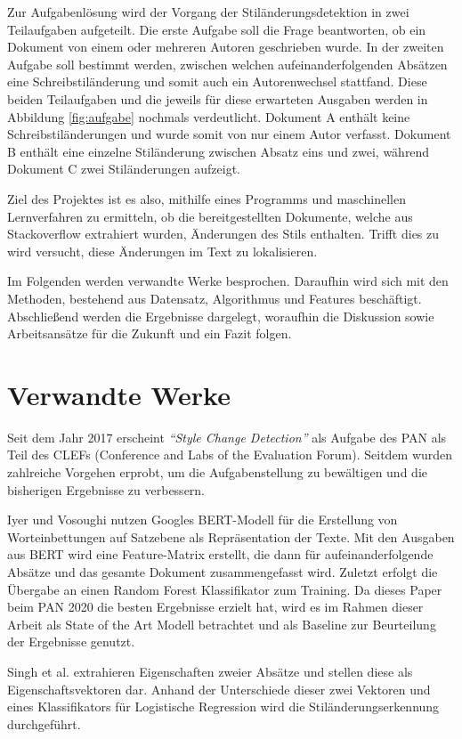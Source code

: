 \documentclass[conference]{IEEEtran}
\begin{document}
	Zur Aufgabenlösung wird der Vorgang der Stiländerungsdetektion in zwei Teilaufgaben aufgeteilt. Die erste Aufgabe soll die Frage beantworten, ob ein Dokument von einem oder mehreren Autoren geschrieben wurde. In der zweiten Aufgabe soll bestimmt werden, zwischen welchen aufeinanderfolgenden Absätzen eine Schreibstiländerung und somit auch ein Autorenwechsel stattfand. Diese beiden Teilaufgaben und die jeweils für diese erwarteten Ausgaben werden in Abbildung \ref{fig:aufgabe} nochmals verdeutlicht. Dokument A enthält keine Schreibstiländerungen und wurde somit von nur einem Autor verfasst. Dokument B enthält eine einzelne Stiländerung zwischen Absatz eins und zwei, während Dokument C zwei Stiländerungen aufzeigt. 
	
	Ziel des Projektes ist es also, mithilfe eines Programms und maschinellen Lernverfahren zu ermitteln, ob die bereitgestellten Dokumente, welche aus Stackoverflow extrahiert wurden, Änderungen des Stils enthalten. Trifft dies zu wird versucht, diese Änderungen im Text zu lokalisieren.
	
	
	Im Folgenden werden verwandte Werke besprochen. Daraufhin wird sich mit den Methoden, bestehend aus Datensatz, Algorithmus und Features beschäftigt. Abschließend werden die Ergebnisse dargelegt, woraufhin die Diskussion sowie Arbeitsansätze für die Zukunft und ein Fazit folgen.
	
\section{Verwandte Werke}
Seit dem Jahr 2017 erscheint \textit{\enquote{Style Change Detection}} als Aufgabe des PAN als Teil des CLEFs (Conference and Labs of the Evaluation Forum). Seitdem wurden zahlreiche Vorgehen erprobt, um die Aufgabenstellung zu bewältigen und die bisherigen Ergebnisse zu verbessern. \cite{vw_b1} 

Iyer und Vosoughi \cite{vw_b2} nutzen Googles BERT-Modell für die Erstellung von Worteinbettungen auf Satzebene als Repräsentation der Texte. Mit den Ausgaben aus BERT wird eine Feature-Matrix erstellt, die dann für aufeinanderfolgende Absätze und das gesamte Dokument zusammengefasst wird. Zuletzt erfolgt die Übergabe an einen Random Forest Klassifikator zum Training. Da dieses Paper beim PAN 2020 die besten Ergebnisse erzielt hat, wird es im Rahmen dieser Arbeit als State of the Art Modell betrachtet und als Baseline zur Beurteilung der Ergebnisse genutzt.

Singh et al. \cite{vw_b3} extrahieren Eigenschaften zweier Absätze und stellen diese als Eigenschaftsvektoren dar. Anhand der Unterschiede dieser zwei Vektoren und eines Klassifikators für Logistische Regression wird die Stiländerungserkennung durchgeführt. 
\end{document}
